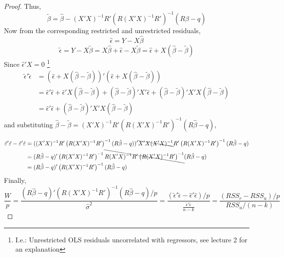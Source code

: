 \documentclass[DIV=14,titlepage=false]{scrreprt}
\begin{document}
\begin{proof}
Thus,
\[
\tilde{\beta} = \hat{\beta} - (X'X)^{-1}R'\left(R(X'X)^{-1}R'\right)^{-1}(R\hat{\beta} - q)
\]
Now from the corresponding restricted and unrestricted residuals,
\[
\hat{\epsilon} = Y - X\hat{\beta}
\]
\[
\tilde{\epsilon} = Y - X\tilde{\beta} = X\hat{\beta} + \hat{\epsilon} - X\tilde{\beta} = \hat{\epsilon} + X(\hat\beta - \tilde{\beta})
\]
Since \(\hat\epsilon'X = 0\) \footnote[1]{I.e.: Unrestricted OLS residuals uncorrelated with regressors, see lecture 2 for an explanation}
\begin{align*}
\tilde{\epsilon}'\tilde{\epsilon} &= (\hat{\epsilon} + X(\hat\beta - \tilde{\beta}))'(\hat{\epsilon} + X(\hat\beta - \tilde{\beta}))\\
&= \hat{\epsilon}'\hat{\epsilon} + \hat{\epsilon}'X(\hat\beta - \tilde{\beta}) + (\hat\beta - \tilde{\beta})'X'\hat{\epsilon}+(\hat{\beta} - \tilde{\beta})'X'X(\hat{\beta} - \tilde{\beta})\\
&= \hat{\epsilon}'\hat{\epsilon} + (\hat{\beta} - \tilde{\beta})'X'X(\hat{\beta} - \tilde{\beta})
\end{align*}
and substituting \(\hat{\beta} - \tilde{\beta} = (X'X)^{-1}R'\left(R(X'X)^{-1}R'\right)^{-1}(R\hat{\beta} - q)\),


\begin{align*}
\tilde{\epsilon}'\tilde{\epsilon} - \hat{\epsilon}'\hat{\epsilon} &= ((X'X)^{-1}R'\left(R(X'X)^{-1}R'\right)^{-1}(R\hat{\beta} - q))'\bcancel{X'X(X'X)^{-1}}R'\left(R(X'X)^{-1}R'\right)^{-1}(R\hat{\beta} - q)\\
&=(R\hat{\beta} - q)'\left(R(X'X)^{-1}R'\right)^{-1}\bcancel{R(X'X)^{-1}R'\left(R(X'X)^{-1}R'\right)^{-1}}(R\hat{\beta} - q)\\
&=(R\hat{\beta} - q)'\left(R(X'X)^{-1}R'\right)^{-1}(R\hat{\beta} - q)
\end{align*}
Finally,
\[
\frac{W}{p} = \frac{(R\hat{\beta} - q)'\left(R(X'X)^{-1}R'\right)^{-1}(R\hat{\beta} - q)/p}{\hat\sigma^2} = \frac{(\tilde{\epsilon}'\tilde{\epsilon} - \hat{\epsilon}'\hat{\epsilon})/p}{\frac{\hat{\epsilon}'\hat{\epsilon}}{n-k}} = \frac{(RSS_r - RSS_u)/p}{RSS_u/(n - k)}
\]


\end{proof}
\end{document}

